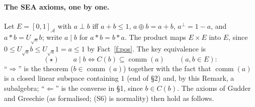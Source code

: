 \documentclass[11pt]{article}
\theoremstyle{remark}
\newcommand{\cA}{\mathcal A}
\DeclareMathOperator{\comm}{comm}
\begin{document}
\paragraph{The SEA axioms, one by one.} Let $E = [0,1]_\cA$ with $a\perp b$ iff $a+b\le1$,
$a\oplus b = a+b$, $a^\perp = 1-a$, and $a\ast b = U_{\sqrt a}b$; write $a\mid b$ for
$a\ast b = b\ast a$. The product maps $E\times E$ into $E$, since
$0\le U_{\sqrt a}b\le U_{\sqrt a}1 = a\le1$ by Fact~\ref{f:pos}. The key equivalence is
\[
 (\star)\qquad a\mid b\iff C(b)\subseteq\comm(a)\qquad(a,b\in E):
\]
``$\Rightarrow$'' is the theorem ($b\in\comm(a)$) together with the fact that $\comm(a)$ is a
closed linear subspace containing $1$ (end of \S2) and, by this Remark, a subalgebra;
``$\Leftarrow$'' is the converse in \S1, since $b\in C(b)$. The axioms of Gudder and
Greechie \cite{GG02} (as formalised; (S6) is normality) then hold as follows.
\end{document}
